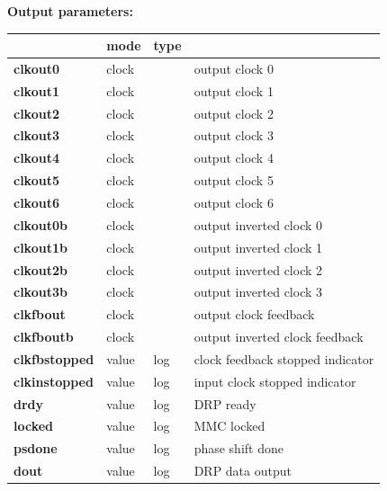            {\bf Output parameters:} \\
            \begin{tabular}{| l | l | l | l |}
            \hline
                               & mode  & type   & \\
            \hline \hline
            {\bf clkout0}      & clock &         & output clock 0 \\ \hline
            {\bf clkout1}      & clock &         & output clock 1 \\ \hline
            {\bf clkout2}      & clock &         & output clock 2 \\ \hline
            {\bf clkout3}      & clock &         & output clock 3 \\ \hline
            {\bf clkout4}      & clock &         & output clock 4 \\ \hline
            {\bf clkout5}      & clock &         & output clock 5 \\ \hline
            {\bf clkout6}      & clock &         & output clock 6 \\ \hline
            {\bf clkout0b}     & clock &         & output inverted clock 0 \\ \hline
            {\bf clkout1b}     & clock &         & output inverted clock 1 \\ \hline
            {\bf clkout2b}     & clock &         & output inverted clock 2 \\ \hline
            {\bf clkout3b}     & clock &         & output inverted clock 3 \\ \hline
            {\bf clkfbout}     & clock &         & output clock feedback \\ \hline
            {\bf clkfboutb}    & clock &         & output inverted clock feedback \\ \hline
            {\bf clkfbstopped} & value & log     & clock feedback stopped indicator \\ \hline
            {\bf clkinstopped} & value & log     & input clock stopped indicator \\ \hline
            {\bf drdy}         & value & log     & DRP ready \\ \hline
            {\bf locked}       & value & log     & MMC locked \\ \hline
            {\bf psdone}       & value & log     & phase shift done \\ \hline
            {\bf dout}         & value & log     & DRP data output \\ \hline
            \end{tabular}

